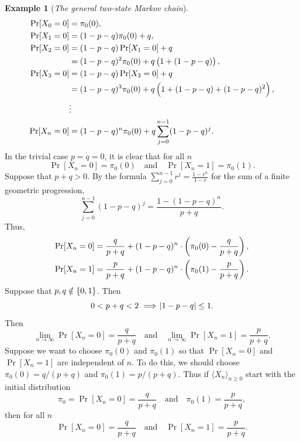 \documentclass[12pt,openany]{book}
\theoremstyle{definition}
\newtheorem{example}{Example}[chapter]
\begin{document}
\begin{example}[\textit{The general two-state Markov chain}]
\begin{align*}
	\Pr[X_0=0]&=\pi_0(0),\\
	\Pr[X_1=0]&=(1-p-q)\pi_0(0)+q,\\
	\Pr[X_2=0]&=(1-p-q)\Pr[X_1=0]+q\\&=(1-p-q)^2\pi_0(0)+q\del{1+(1-p-q)},\\
	\Pr[X_3=0]&=(1-p-q)\Pr[X_2=0]+q\\&=(1-p-q)^3\pi_0(0)+q\del{1+(1-p-q)+(1-p-q)^2},\\
	&\vdots\\
	\Pr[X_n=0]&=(1-p-q)^n\pi_0(0) + q\sum_{j=0}^{n-1}(1-p-q)^j.
\end{align*} In the trivial case $p=q=0$, it is clear that for all $n$ \[
	\Pr[X_n=0]=\pi_0(0)\quad\text{and}\quad \Pr[X_n=1]=\pi_0(1).
\]	Suppose that $p+q>0$. By the formula $\displaystyle\sum_{j=0}^{n-1}r^j=\frac{1-r^n}{1-r}$ for the sum of a finite geometric progression, \[
	\sum_{j=0}^{n-1}(1-p-q)^j=\frac{1-(1-p-q)^n}{p+q}.
	\] Thus, \begin{align*}
		\Pr[X_n=0]&=\frac{q}{p+q}+(1-p-q)^n\cdot\del{\pi_0(0)-\frac{q}{p+q}},\\
		\Pr[X_n=1]&=\frac{p}{p+q}+(1-p-q)^n\cdot\del{\pi_0(1)-\frac{p}{p+q}}.
	\end{align*} Suppose that $p,q\notin\set{0,1}$. Then \[
	0<p+q<2\implies\abs{1-p-q}\leq 1.
	\] Then \[
	\lim\limits_{n\to\infty}\Pr[X_n=0]=\frac{q}{p+q}\quad\text{and}\quad\lim\limits_{n\to\infty}\Pr[X_n=1]=\frac{p}{p+q}.
	\] Suppose we want to choose $\pi_0(0)$ and $\pi_0(1)$ so that $\Pr[X_n=0]$ and $\Pr[X_n=1]$ are independent of $n$. To do this, we should choose $\pi_0(0)=q/(p+q)$ and $\pi_0(1)=p/(p+q)$.
	Thus if $\langle X_n\rangle_{n\geq 0}$ start with the initial distribution \[
	\pi_0=\Pr[X_n=0]=\frac{q}{p+q}\quad\text{and}\quad\pi_0(1)=\frac{p}{p+q},
	\] then for all $n$ \[
	\Pr[X_n=0]=\frac{q}{p+q}\quad\text{and}\quad\Pr[X_n=1]=\frac{p}{p+q}.
	\]
	\end{example}
\end{document}
